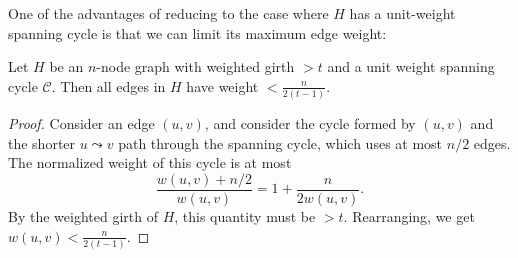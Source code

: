 \documentclass{article}\usepackage[a4paper,margin=20mm]{geometry}
\newcommand{\eps}{\varepsilon}
\newcommand{\cee}{\mathcal{C}}
\newcommand{\forward}{\texttt{forward}}
\newcommand{\backward}{\texttt{backward}}
\begin{document}
One of the advantages of reducing to the case where $H$ has a unit-weight spanning cycle is that we can limit its maximum edge weight:
\begin{lemma} \label{lem:maxwt}
Let $H$ be an $n$-node graph with weighted girth $>t$ and a unit weight spanning cycle $\cee$.
Then all edges in $H$ have weight $< \frac{n}{2(t-1)}$.
\end{lemma}
\begin{proof}
Consider an edge $(u, v)$, and consider the cycle formed by $(u, v)$ and the shorter $u \leadsto v$ path through the spanning cycle, which uses at most $n/2$ edges.
The normalized weight of this cycle is at most
$$\frac{w(u, v) + n/2}{w(u, v)} = 1 + \frac{n}{2w(u, v)}.$$
By the weighted girth of $H$, this quantity must be $>t$.
Rearranging, we get
$w(u, v) < \frac{n}{2(t-1)}$.%
\end{proof}










\end{document}
